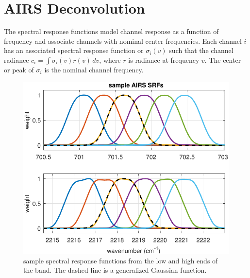 \documentclass[journal]{IEEEtran}
\begin{document}
\section{AIRS Deconvolution}
\label{decon}

The {\airs} spectral response functions model channel response as a
function of frequency and associate channels with nominal center
frequencies.  Each {\airs} channel $i$ has an associated spectral
response function or {\srf} $\sigma_i(v)$ such that the channel
radiance $c_i = \int \sigma_i(v)r(v)\,dv$, where $r$ is radiance at
frequency $v$.  The center or peak of $\sigma_i$ is the nominal
channel frequency.

\begin{figure} %
  \centering
  \includegraphics[width=\linewidth]{figures/airs_sample_SRF.pdf}
  \caption{sample {\airs} spectral response functions from the low
    and high ends of the band.   The dashed line is a generalized
    Gaussian function.}
  \label{srfs1}
\end{figure}
\end{document}
